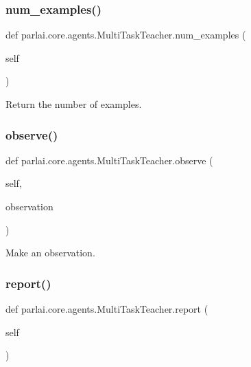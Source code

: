 \subsubsection{\texorpdfstring{num\+\_\+examples()}{num\_examples()}}
{\footnotesize\ttfamily def parlai.\+core.\+agents.\+Multi\+Task\+Teacher.\+num\+\_\+examples (\begin{DoxyParamCaption}\item[{}]{self }\end{DoxyParamCaption})}

\begin{DoxyVerb}Return the number of examples.
\end{DoxyVerb}
 \mbox{\label{classparlai_1_1core_1_1agents_1_1MultiTaskTeacher_a42290221cabd0f1ca21cb87a2228af10}} 
\subsubsection{\texorpdfstring{observe()}{observe()}}
{\footnotesize\ttfamily def parlai.\+core.\+agents.\+Multi\+Task\+Teacher.\+observe (\begin{DoxyParamCaption}\item[{}]{self,  }\item[{}]{observation }\end{DoxyParamCaption})}

\begin{DoxyVerb}Make an observation.
\end{DoxyVerb}
 \mbox{\label{classparlai_1_1core_1_1agents_1_1MultiTaskTeacher_ac93a499c6438ee1b57d0ad6a702851ae}} 
\subsubsection{\texorpdfstring{report()}{report()}}
{\footnotesize\ttfamily def parlai.\+core.\+agents.\+Multi\+Task\+Teacher.\+report (\begin{DoxyParamCaption}\item[{}]{self }\end{DoxyParamCaption})}

